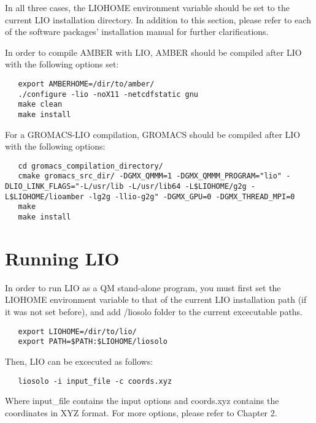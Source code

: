 In all three cases, the \textcolor{lioteal}{LIOHOME} environment variable 
should be set to the current LIO installation directory. In addition to 
this section, please refer to each of the software packages' installation
manual for further clarifications.

In order to compile AMBER with LIO, AMBER should be compiled after LIO with
the following options set:

\begin{lstlisting}
   export AMBERHOME=/dir/to/amber/
   ./configure -lio -noX11 -netcdfstatic gnu
   make clean
   make install
\end{lstlisting}

For a GROMACS-LIO compilation, GROMACS should be compiled after LIO with
the following options:

\begin{lstlisting}
   cd gromacs_compilation_directory/
   cmake gromacs_src_dir/ -DGMX_QMMM=1 -DGMX_QMMM_PROGRAM="lio" -DLIO_LINK_FLAGS="-L/usr/lib -L/usr/lib64 -L$LIOHOME/g2g -L$LIOHOME/lioamber -lg2g -llio-g2g" -DGMX_GPU=0 -DGMX_THREAD_MPI=0
   make
   make install
\end{lstlisting}

\section{Running LIO}
In order to run LIO as a QM stand-alone program, you must first set the 
\textcolor{lioteal}{LIOHOME} environment variable to that of the current 
LIO installation path (if it was not set before), and add /liosolo folder
to the current excecutable paths.

\begin{lstlisting}
   export LIOHOME=/dir/to/lio/
   export PATH=$PATH:$LIOHOME/liosolo
\end{lstlisting}

Then, LIO can be excecuted as follows:
\begin{lstlisting}
   liosolo -i input_file -c coords.xyz
\end{lstlisting}
Where input\_file contains the input options and coords.xyz contains the 
coordinates in XYZ format. For more options, please refer to Chapter 2.


